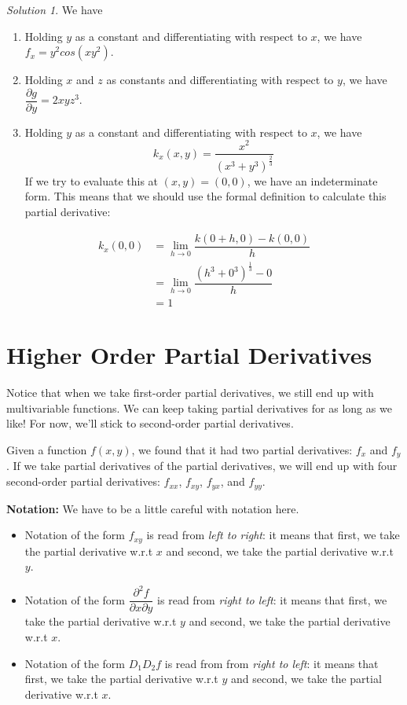 \documentclass[
]{book}
\providecommand{\tightlist}{%
  \setlength{\itemsep}{0pt}\setlength{\parskip}{0pt}}
\theoremstyle{definition}
\theoremstyle{definition}
\theoremstyle{definition}
\theoremstyle{definition}
\theoremstyle{remark}
\newtheorem*{solution}{Solution}
\begin{document}
\begin{solution}

We have

\begin{enumerate}
\def\labelenumi{\alph{enumi}.}
\tightlist
\item
  Holding \(y\) as a constant and differentiating with respect to \(x\), we have \(f_x = y^2cos(xy^2)\).
\item
  Holding \(x\) and \(z\) as constants and differentiating with respect to \(y\), we have \(\dfrac{\partial g}{\partial y}= 2xyz^3\).
\item
  Holding \(y\) as a constant and differentiating with respect to \(x\), we have \[k_x(x,y)=\dfrac{x^2}{(x^3+y^3)^{\frac{2}{3}}}\] If we try to evaluate this at \((x,y)=(0,0)\), we have an indeterminate form. This means that we should use the formal definition to calculate this partial derivative:
\end{enumerate}

\begin{align*}
k_x(0,0)&=\lim_{h\to 0}\dfrac{k(0+h,0)-k(0,0)}{h}\\ &=\lim_{h\to 0}\dfrac{(h^3+0^3)^{\frac{1}{3}}-0}{h}\\&=1
\end{align*}

\end{solution}

\hypertarget{higher-order-partial-derivatives}{%
\section{Higher Order Partial Derivatives}\label{higher-order-partial-derivatives}}

Notice that when we take first-order partial derivatives, we still end up with multivariable functions. We can keep taking partial derivatives for as long as we like! For now, we'll stick to second-order partial derivatives.

Given a function \(f(x,y)\), we found that it had two partial derivatives: \(f_x\) and \(f_y\). If we take partial derivatives of the partial derivatives, we will end up with four second-order partial derivatives: \(f_{xx}\), \(f_{xy}\), \(f_{yx}\), and \(f_{yy}\).

\textbf{Notation:} We have to be a little careful with notation here.

\begin{itemize}
\tightlist
\item
  Notation of the form \(f_{xy}\) is read from \emph{left to right}: it means that first, we take the partial derivative w.r.t \(x\) and second, we take the partial derivative w.r.t \(y\).
\item
  Notation of the form \(\dfrac{\partial^2 f}{\partial x\partial y}\) is read from \emph{right to left}: it means that first, we take the partial derivative w.r.t \(y\) and second, we take the partial derivative w.r.t \(x\).
\item
  Notation of the form \(D_1D_2f\) is read from from \emph{right to left}: it means that first, we take the partial derivative w.r.t \(y\) and second, we take the partial derivative w.r.t \(x\).
\end{itemize}
\end{document}
